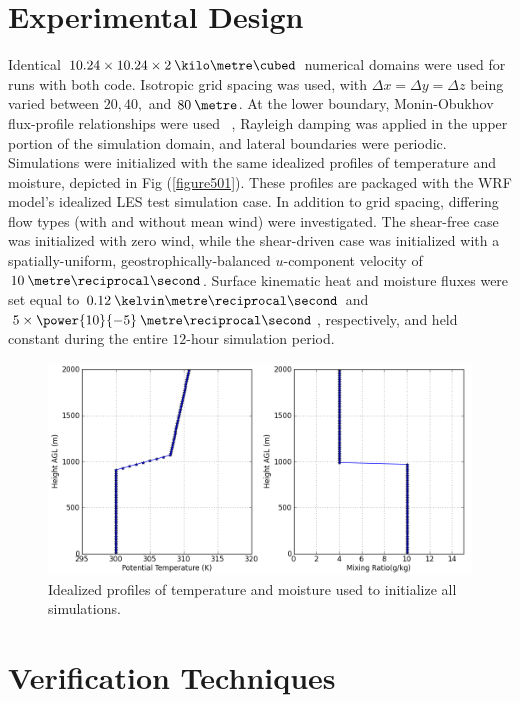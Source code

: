 \section{Experimental Design}
\label{ed-51}

Identical $10.24 \times 10.24 \times 2 \: \kilo\metre\cubed$ numerical domains were used for runs with both code. Isotropic grid spacing was used, with $\Delta x = \Delta y = \Delta z$ being varied between $20, 40,$ and $80\: \metre$. At the lower boundary, Monin-Obukhov flux-profile relationships were used ~\citep{MO, Dyer}, Rayleigh damping was applied in the upper portion of the simulation domain, and lateral boundaries were periodic. Simulations were initialized with the same idealized profiles of temperature and moisture, depicted in Fig (\autoref{figure501}). These profiles are packaged with the WRF model's idealized LES test simulation case. In addition to grid spacing, differing flow types (with and without mean wind) were investigated. The shear-free case was initialized with zero wind, while the shear-driven case was initialized with a spatially-uniform, geostrophically-balanced $u$-component velocity of $10 \: \metre\reciprocal\second$. Surface kinematic heat and moisture fluxes were set equal to  $0.12 \: \kelvin \metre\reciprocal\second$ and $5\times \power{10}{-5} \: \metre\reciprocal\second$, respectively, and held constant during the entire $12\mbox{-}$hour simulation period.


\begin{figure}[H]
\begin{center}
\includegraphics[width=\textwidth]{figures/chapter5/ideal_input_soundings}
\end{center}
\caption{Idealized profiles of temperature and moisture used to initialize all simulations.}
\label{figure501}
\end{figure}


\section{Verification Techniques}
\label{vt-52}

